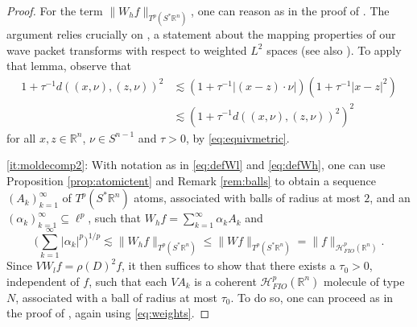 \documentclass{amsart}
\newcommand {\Hp}{\mathcal{H}^{p}_{FIO}(\Rn)}
\newcommand {\Rn}{\mathbb{R}^{n}}
\newcommand {\Sp}{S^{*}\Rn}
\theoremstyle{definition}
\numberwithin{equation}{section}
\begin{document}
\begin{proof}
For the term $\|W_{h}f\|_{T^{p}(\Sp)}$, one can reason as in the proof of \cite[Theorem 8.3]{HaPoRo20}. The argument relies crucially on \cite[Lemma {8.2}]{HaPoRo20}, a statement about the mapping properties of our wave packet transforms with respect to weighted $L^{2}$ spaces (see also \cite[Lemma 2.14]{Smith98a}). To apply that lemma, observe that 
\begin{equation}\label{eq:weights}
\begin{aligned}
1+\tau^{-1}d((x,\nu),(z,\nu))^{2}&\lesssim (1+\tau^{-1}|(x-z)\cdot\nu|)(1+\tau^{-1}|x-z|^{2})\\
&\lesssim (1+\tau^{-1}d((x,\nu),(z,\nu))^{2})^{2}
\end{aligned}
\end{equation}
for all $x,z\in\Rn$, $\nu\in S^{n-1}$ and $\tau>0$, by \eqref{eq:equivmetric}.

\eqref{it:moldecomp2}: With notation as in \eqref{eq:defWl} and \eqref{eq:defWh}, one can use Proposition \ref{prop:atomictent} and Remark \ref{rem:balls} to obtain a sequence $(A_{k})_{k=1}^{\infty}$ of $T^{p}(\Sp)$ atoms, associated with balls of radius at most $2$, and an $(\alpha_{k})_{k=1}^{\infty}\subseteq\ell^{p}$, such that $W_{h}f=\sum_{k=1}^{\infty}\alpha_{k}A_{k}$ and 
\[
\Big(\sum_{k=1}^{\infty}|\alpha_{k}|^{p}\Big)^{1/p}\lesssim \|W_{h}f\|_{T^{p}(\Sp)}\leq \|Wf\|_{T^{p}(\Sp)}=\|f\|_{\Hp}.
\]
Since $VW_{l}f=\rho(D)^{2}f$, it then suffices to show that there exists a $\tau_{0}>0$, independent of $f$, such that each $VA_{k}$ is a coherent $\Hp$ molecule of type $N$, associated with a ball of radius at most $\tau_{0}$. To do so, one can proceed as in the proof of \cite[Theorem 8.3]{HaPoRo20}, again using \eqref{eq:weights}.  
\end{proof}
\end{document}
